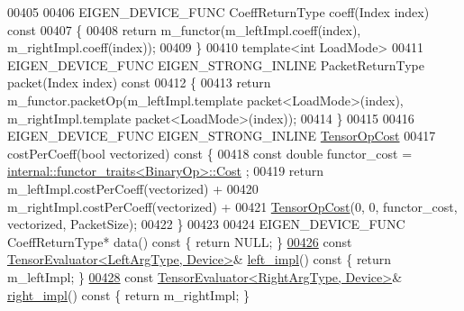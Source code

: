 \begin{DoxyCode}
00405 
00406   EIGEN\_DEVICE\_FUNC CoeffReturnType coeff(Index index)\textcolor{keyword}{ const}
00407 \textcolor{keyword}{  }\{
00408     \textcolor{keywordflow}{return} m\_functor(m\_leftImpl.coeff(index), m\_rightImpl.coeff(index));
00409   \}
00410   \textcolor{keyword}{template}<\textcolor{keywordtype}{int} LoadMode>
00411   EIGEN\_DEVICE\_FUNC EIGEN\_STRONG\_INLINE PacketReturnType packet(Index index)\textcolor{keyword}{ const}
00412 \textcolor{keyword}{  }\{
00413     \textcolor{keywordflow}{return} m\_functor.packetOp(m\_leftImpl.template packet<LoadMode>(index), m\_rightImpl.template 
      packet<LoadMode>(index));
00414   \}
00415 
00416   EIGEN\_DEVICE\_FUNC EIGEN\_STRONG\_INLINE \hyperlink{class_eigen_1_1_tensor_op_cost}{TensorOpCost}
00417   costPerCoeff(\textcolor{keywordtype}{bool} vectorized)\textcolor{keyword}{ const }\{
00418     \textcolor{keyword}{const} \textcolor{keywordtype}{double} functor\_cost = \hyperlink{struct_eigen_1_1internal_1_1functor__traits}{internal::functor\_traits<BinaryOp>::Cost}
      ;
00419     \textcolor{keywordflow}{return} m\_leftImpl.costPerCoeff(vectorized) +
00420            m\_rightImpl.costPerCoeff(vectorized) +
00421            \hyperlink{class_eigen_1_1_tensor_op_cost}{TensorOpCost}(0, 0, functor\_cost, vectorized, PacketSize);
00422   \}
00423 
00424   EIGEN\_DEVICE\_FUNC CoeffReturnType* data()\textcolor{keyword}{ const }\{ \textcolor{keywordflow}{return} NULL; \}
\hyperlink{struct_eigen_1_1_tensor_evaluator_3_01const_01_tensor_cwise_binary_op_3_01_binary_op_00_01_left_d0674d2fbf9b5f3fd40347d3eda7a38d_a0aed421d76c236f84852ecff91aac3ce}{00426}   \textcolor{keyword}{const} \hyperlink{struct_eigen_1_1_tensor_evaluator}{TensorEvaluator<LeftArgType, Device>}& 
      \hyperlink{struct_eigen_1_1_tensor_evaluator_3_01const_01_tensor_cwise_binary_op_3_01_binary_op_00_01_left_d0674d2fbf9b5f3fd40347d3eda7a38d_a0aed421d76c236f84852ecff91aac3ce}{left\_impl}()\textcolor{keyword}{ const }\{ \textcolor{keywordflow}{return} m\_leftImpl; \}
\hyperlink{struct_eigen_1_1_tensor_evaluator_3_01const_01_tensor_cwise_binary_op_3_01_binary_op_00_01_left_d0674d2fbf9b5f3fd40347d3eda7a38d_a325bdec16dd97ac649116cd578d9aac3}{00428}   \textcolor{keyword}{const} \hyperlink{struct_eigen_1_1_tensor_evaluator}{TensorEvaluator<RightArgType, Device>}& 
      \hyperlink{struct_eigen_1_1_tensor_evaluator_3_01const_01_tensor_cwise_binary_op_3_01_binary_op_00_01_left_d0674d2fbf9b5f3fd40347d3eda7a38d_a325bdec16dd97ac649116cd578d9aac3}{right\_impl}()\textcolor{keyword}{ const }\{ \textcolor{keywordflow}{return} m\_rightImpl; \}

\end{DoxyCode}
